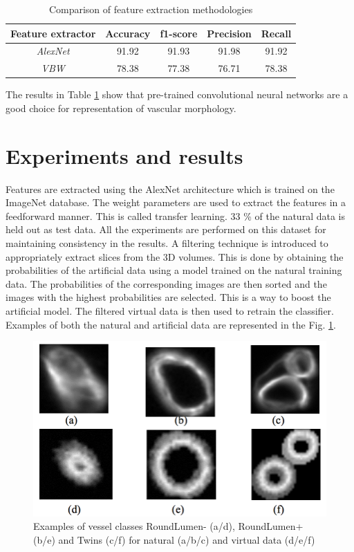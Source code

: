 \begin{table}[H]
\centering
\caption{Comparison of feature extraction methodologies}
\begin{tabular}{ | c | c | c | c | c |} 
\hline
Feature extractor  & Accuracy	& f1-score	 & Precision & Recall \\ 
\hline
\textit{AlexNet} & 91.92 & 91.93 & 91.98 & 91.92 \\ 
\hline
\textit{VBW} & 78.38	& 77.38 & 	76.71 & 78.38 \\
\hline
\end{tabular}
\label{table:FE}
\end{table}

The results in Table \ref{table:FE} show that pre-trained convolutional neural networks are a good choice for representation of vascular morphology.

\section{Experiments and results}
Features are extracted using the AlexNet architecture which is trained on the ImageNet \cite{deng2009imagenet} database. The weight parameters are used to extract the features in a feedforward manner. This is called transfer learning. 33 \% of the natural data is held out as test data. All the experiments are performed on this dataset for maintaining consistency in the results. 
A filtering technique is introduced to appropriately extract slices from the 3D volumes. This is done by obtaining the probabilities of the artificial data using a model trained on the natural training data. The probabilities of the corresponding images are then sorted and the images with the highest probabilities are selected. This is a way to boost the artificial model.  The filtered virtual data is then used to retrain the classifier. Examples of both the natural and artificial data are represented in the Fig. \ref{fig:slices}.

\begin{figure}[H]
\centering
\includegraphics[width=1.0\textwidth]{img/slices}
\caption{ Examples of vessel classes RoundLumen- (a/d), RoundLumen+ (b/e) and Twins (c/f) for natural (a/b/c) and virtual data (d/e/f)}
\label{fig:slices}
\end{figure}

